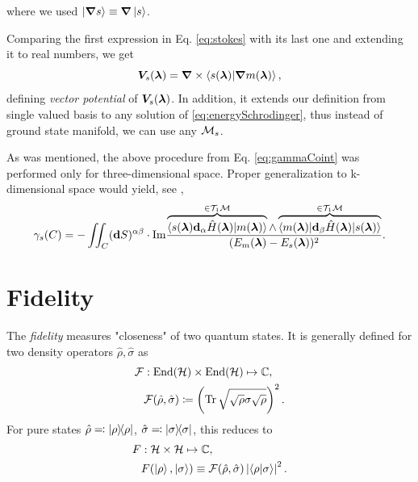 where we used $\ket{\bm \nabla s}\equiv\bm \nabla \ket{ s}$. 

Comparing the first expression in Eq. \ref{eq:stokes} with its last one and extending it to real numbers, we get
\begin{equation}
    \bm V_s({\bm\lambda})=\bm \nabla\times\braket{s({\bm\lambda})|\bm \nabla m({\bm\lambda})}, 
    \label{eq:vectorPotentialDef}  
\end{equation}
defining \emph{vector potential} of $\bm V_s({\bm\lambda})$. In addition, it extends our definition from single valued basis to any solution of \ref{eq:energySchrodinger}, thus instead of ground state manifold, we can use any $\mathcal{M}_s$.

As was mentioned, the above procedure from Eq. \ref{eq:gammaCoint} was performed only for three-dimensional space. Proper generalization to k-dimensional space would yield, see \citet{berry1984},
\begin{equation}
    \gamma_s(C) = -\iint_C (\bm{\mathrm{d}} S)^{\alpha\beta} \cdot\textrm{Im} \frac{
            \overbrace{\braket{s({\bm\lambda})\bm{\mathrm{d}}_\alpha \hat{H}({\bm\lambda}) |m({\bm\lambda})}}^{\in\mathcal{T}_1\mathcal{M}}\wedge \overbrace{\braket{m({\bm\lambda})|\bm{\mathrm{d}}_\beta\hat{H}({\bm\lambda})|s({\bm\lambda})}}^{\in\mathcal{T}_1\mathcal{M}}    
             }{
(E_m({\bm\lambda})-E_s({\bm\lambda}))^2
             }.
\end{equation}






\section{Fidelity}
The \emph{fidelity} measures "closeness" of two quantum states. It is generally defined for two density operators $\hat\rho, \hat\sigma$ as
\begin{equation}
    \begin{split}
        \mathcal F&: \operatorname{End}(\mathcal{H})\times \operatorname{End}(\mathcal{H})\mapsto \mathbb{C}, \\
        &\mathcal F(\hat\rho,\hat\sigma)\coloneqq \left(\operatorname{\textrm{Tr}} \sqrt{\sqrt{\rho}\sigma\sqrt{\rho}}\right)^2.
    \end{split}
\end{equation}
For pure states $\hat\rho\eqqcolon\ket{\rho}\!\!\bra{\rho}$, $\hat\sigma\eqqcolon\ket{\sigma}\!\!\bra{\sigma}$, this reduces to
\begin{equation}
    \begin{split}    
        F&: \mathcal{H}\times\mathcal{H}\mapsto \mathbb{C}, \\
        &F(\ket{\rho},\ket{\sigma}) \equiv  \mathcal F(\hat\rho,\hat\sigma)\left| \braket{\rho|\sigma}\right|^2.
    \end{split}
\end{equation}



